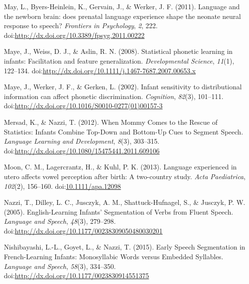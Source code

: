 \documentclass[man,floatsintext]{apa6}
\begin{document}
\leavevmode\hypertarget{ref-may2011}{}%
May, L., Byers-Heinlein, K., Gervain, J., \& Werker, J. F. (2011). Language and the newborn brain: does prenatal language experience shape the neonate neural response to speech? \emph{Frontiers in Psychology}, \emph{2}, 222. doi:\href{https://doi.org/http://dx.doi.org/10.3389/fpsyg.2011.00222}{http://dx.doi.org/10.3389/fpsyg.2011.00222}

\leavevmode\hypertarget{ref-maye2008}{}%
Maye, J., Weiss, D. J., \& Aslin, R. N. (2008). Statistical phonetic learning in infants: Facilitation and feature generalization. \emph{Developmental Science}, \emph{11}(1), 122--134. doi:\href{https://doi.org/http://dx.doi.org/10.1111/j.1467-7687.2007.00653.x}{http://dx.doi.org/10.1111/j.1467-7687.2007.00653.x}

\leavevmode\hypertarget{ref-maye2002}{}%
Maye, J., Werker, J. F., \& Gerken, L. (2002). Infant sensitivity to distributional information can affect phonetic discrimination. \emph{Cognition}, \emph{82}(3), 101--111. doi:\href{https://doi.org/http://dx.doi.org/10.1016/S0010-0277(01)00157-3}{http://dx.doi.org/10.1016/S0010-0277(01)00157-3}

\leavevmode\hypertarget{ref-mersad2012}{}%
Mersad, K., \& Nazzi, T. (2012). When Mommy Comes to the Rescue of Statistics: Infants Combine Top-Down and Bottom-Up Cues to Segment Speech. \emph{Language Learning and Development}, \emph{8}(3), 303--315. doi:\href{https://doi.org/http://dx.doi.org/10.1080/15475441.2011.609106}{http://dx.doi.org/10.1080/15475441.2011.609106}

\leavevmode\hypertarget{ref-moon2013}{}%
Moon, C. M., Lagercrantz, H., \& Kuhl, P. K. (2013). Language experienced in utero affects vowel perception after birth: A two-country study. \emph{Acta Paediatrica}, \emph{102}(2), 156--160. doi:\href{https://doi.org/10.1111/apa.12098}{10.1111/apa.12098}

\leavevmode\hypertarget{ref-nazzi2005}{}%
Nazzi, T., Dilley, L. C., Jusczyk, A. M., Shattuck-Hufnagel, S., \& Jusczyk, P. W. (2005). English-Learning Infants' Segmentation of Verbs from Fluent Speech. \emph{Language and Speech}, \emph{48}(3), 279--298. doi:\href{https://doi.org/http://dx.doi.org/10.1177/00238309050480030201}{http://dx.doi.org/10.1177/00238309050480030201}

\leavevmode\hypertarget{ref-nishibayashi2015}{}%
Nishibayashi, L.-L., Goyet, L., \& Nazzi, T. (2015). Early Speech Segmentation in French-Learning Infants: Monosyllabic Words versus Embedded Syllables. \emph{Language and Speech}, \emph{58}(3), 334--350. doi:\href{https://doi.org/http://dx.doi.org/10.1177/0023830914551375}{http://dx.doi.org/10.1177/0023830914551375}
\end{document}
